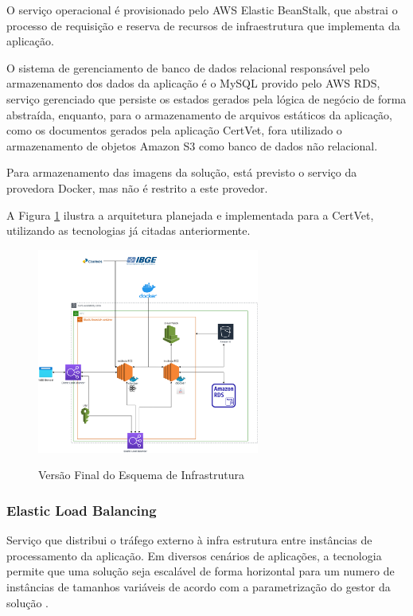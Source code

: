 \documentclass[
    12pt,               %
    openright,          %
    oneside,
    a4paper,            %
    BIBLATEX,           %
    TODO,               %
    english,            %
    brazil              %
    ]{ifsp-spo-inf-ctds}
\begin{document}
        O serviço operacional é provisionado pelo AWS Elastic BeanStalk, que abstrai o processo de requisição e reserva de recursos de infraestrutura que implementa da aplicação.
        
        O sistema de gerenciamento de banco de dados relacional responsável pelo armazenamento dos dados da aplicação é o MySQL provido pelo AWS RDS, serviço gerenciado que persiste os estados gerados pela lógica de negócio de forma abstraída, enquanto, para o armazenamento de arquivos estáticos da aplicação, como os documentos gerados pela aplicação CertVet, fora utilizado o armazenamento de objetos Amazon S3 como banco de dados não relacional.
        
        Para armazenamento das imagens da solução, está previsto o serviço da provedora Docker, mas não é restrito a este provedor.
        
        A Figura \ref{fig:infra3} ilustra a arquitetura planejada e implementada para a CertVet, utilizando as tecnologias já citadas anteriormente.
        

        \begin{figure}[H]
            \centering
            \caption{Versão Final do Esquema de Infrastrutura}
            \centering
            \includegraphics[width=0.65\textwidth]{images/ArquiteturaAplicacao_v6.png}
            \label{fig:infra3}
        \end{figure} 

        \subsubsection{Elastic Load Balancing}
        
            Serviço que distribui o tráfego externo à infra estrutura entre instâncias de processamento da aplicação. Em diversos cenários de aplicações, a tecnologia permite que uma solução seja escalável de forma horizontal para um numero de instâncias de tamanhos variáveis de acordo com a parametrização do gestor da solução .
\end{document}
